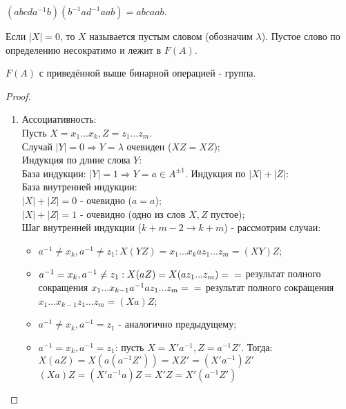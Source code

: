 \begin{example}
    $(abcda^{-1}b)(b^{-1}ad^{-1}aab) = abcaab$.
\end{example}
\begin{definition}
    Если $|X| = 0$, то $X$ называется пустым словом (обозначим $\lambda$). Пустое слово по определению несократимо и лежит в $F(A)$.
\end{definition}
\begin{theorem}
    $F(A)$ с приведённой выше бинарной операцией - группа.
\end{theorem}
\begin{proof}\tab
    \begin{enumerate}
        \item Ассоциативность:\\
        Пусть $X = x_1...x_k, Z = z_1...z_m$.\\
        Случай $|Y| = 0 \Longrightarrow Y = \lambda$ очевиден ($XZ = XZ$);\\
        Индукция по длине слова $Y$:\\
        База индукции: $|Y| = 1 \Longrightarrow Y = a \in A^{\pm 1}$. Индукция по $|X| + |Z|$:\\
        \tab База внутренней индукции: \\
        \tab $|X| + |Z| = 0$ - очевидно ($a = a$);\\
        \tab $|X| + |Z| = 1$ - очевидно (одно из слов $X, Z$ пустое);\\
        \tab Шаг внутренней индукции ($k+m-2 \rightarrow k+m$) - рассмотрим случаи:
        \begin{itemize}
            \item $a^{-1} \neq x_k, a^{-1} \neq z_1: X(YZ) = x_1...x_kaz_1...z_m = (XY)Z$;
            \item $a^{-1} = x_k, a^{-1} \neq z_1: X(aZ) = X(az_1...z_m) =\\=$ результат полного сокращения $x_1...x_{k-1}a^{-1}az_1...z_m =\\=$ результат полного сокращения $x_1...x_{k-1}z_1...z_m = (Xa)Z$;
            \item $a^{-1} \neq x_k, a^{-1} = z_1$ - аналогично предыдущему;
            \item $a^{-1} = x_k, a^{-1} = z_1$: пусть $X = X'a^{-1}, Z = a^{-1}Z'$. Тогда:\\
            $X(aZ) = X(a(a^{-1}Z')) = XZ' = (X'a^{-1})Z'$\\
            $(Xa)Z = (X'a^{-1}a)Z = X'Z = X'(a^{-1}Z')$\\

\end{itemize}
\end{enumerate}
\end{proof}
